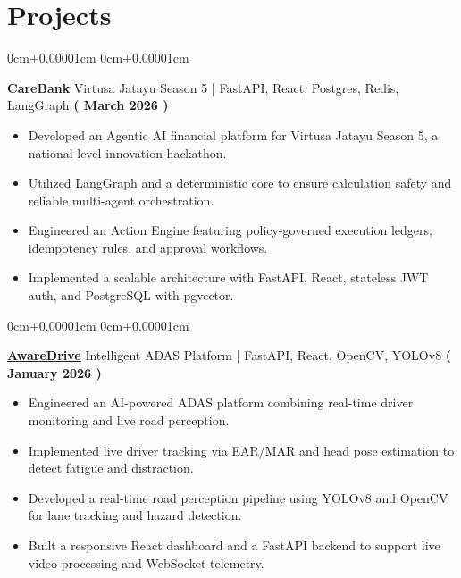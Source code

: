 \documentclass[10pt,a4paper]{article}
\newenvironment{highlights}{
    \begin{itemize}[
        topsep=0.10cm,
        parsep=0.10cm,
        partopsep=0pt,
        itemsep=0pt,
        leftmargin=10pt,
    ]
    }{
    \end{itemize}
}
\newenvironment{onecolentry}{
    \begin{adjustwidth}{
        0cm+0.00001cm
    }{
        0cm+0.00001cm
    }
    }{
    \end{adjustwidth}
}
\begin{document}
    \section{Projects}\label{sec:projects}
    \begin{onecolentry}
        \textbf{CareBank} Virtusa Jatayu Season 5 | FastAPI, React, Postgres, Redis, LangGraph \hfill \textbf{( March 2026 )} \\
        \begin{highlights}
            \item Developed an Agentic AI financial platform for Virtusa Jatayu Season 5, a national-level innovation hackathon.
            \item Utilized LangGraph and a deterministic core to ensure calculation safety and reliable multi-agent orchestration.
            \item Engineered an Action Engine featuring policy-governed execution ledgers, idempotency rules, and approval workflows.
            \item Implemented a scalable architecture with FastAPI, React, stateless JWT auth, and PostgreSQL with pgvector.
        \end{highlights}
    \end{onecolentry}
    \vspace{0.1cm}
    \begin{onecolentry}
        \textbf{\href{https://github.com/Jefino9488/AwareDrive}{AwareDrive}} Intelligent ADAS Platform | FastAPI, React, OpenCV, YOLOv8 \hfill \textbf{( January 2026 )} \\
        \begin{highlights}
            \item Engineered an AI-powered ADAS platform combining real-time driver monitoring and live road perception. \\
            \item Implemented live driver tracking via EAR/MAR and head pose estimation to detect fatigue and distraction. \\
            \item Developed a real-time road perception pipeline using YOLOv8 and OpenCV for lane tracking and hazard detection. \\
            \item Built a responsive React dashboard and a FastAPI backend to support live video processing and WebSocket telemetry. \\
        \end{highlights}
    \end{onecolentry}
\end{document}
